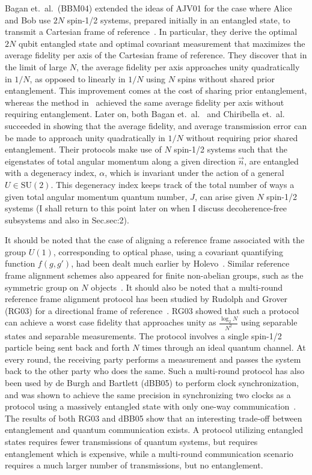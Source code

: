 Bagan et.~al.~(BBM04) extended the ideas of AJV01 for the case where Alice and Bob use $2N$ spin-1/2 systems, prepared initially in an entangled state, to transmit a Cartesian frame of reference~\cite{BBM04a}.  In particular, they derive the optimal $2N$ qubit entangled state and optimal covariant measurement that maximizes the average fidelity per axis of the Cartesian frame of reference. They discover that in the limit of large $N$, the average fidelity per axis approaches unity quadratically in $1/N$, as opposed to linearly in $1/N$ using $N$ spins without shared prior entanglement.  This improvement comes at the cost of sharing prior entanglement, whereas the method in~\cite{PS02a,PS02b} achieved the same average fidelity per axis without requiring entanglement.  Later on, both Bagan et.~al.~\cite{BBM04b} and Chiribella et.~al.~\cite{CDPS04a} succeeded in showing that the average fidelity, and average transmission error can be made to approach unity quadratically in $1/N$ without requiring prior shared entanglement.  Their protocols make use of $N$ spin-1/2 systems such that the eigenstates of total angular momentum along a given direction $\vec{n}$, are entangled with a degeneracy index, $\alpha$, which is invariant under the action of a general $U\in\mathrm{SU}(2)$.  This degeneracy index keeps track of the total number of ways a given total angular momentum quantum number, $J$, can arise given $N$ spin-1/2 systems (I shall return to this point later on when I discuss decoherence-free subsystems and also in Sec.{sec:2}). 

It should be noted that the case of aligning a reference frame associated with the group $U(1)$, corresponding to optical phase, using a covariant quantifying function $f(g,g')$, had been dealt much earlier  by Holevo~\cite{H80}.  Similar reference frame alignment schemes also appeared for finite non-abelian groups, such as the symmetric group on $N$ objects~\cite{KK04}.  It should also be noted that a multi-round reference frame alignment protocol has been studied by Rudolph and Grover (RG03) for a directional frame of reference~\cite{RG03}. RG03 showed that such a protocol can achieve a worst case fidelity that approaches unity as $\frac{\log_2 N}{N^2}$ using separable states and separable measurements.  The protocol involves a single spin-1/2 particle being sent back and forth $N$ times through an ideal quantum channel.  At every round, the receiving party performs a measurement and passes the system back to the other party who does the same. Such a multi-round protocol has also been used by de Burgh and Bartlett (dBB05) to perform clock synchronization, and was shown to achieve the same precision in synchronizing two clocks as a protocol using a massively entangled state with only one-way communication~\cite{dBB05}.  The results of both RG03 and dBB05 show that an interesting trade-off between entanglement and quantum communication exists. A protocol utilizing entangled states requires fewer transmissions of quantum systems, but requires entanglement which is expensive, while a multi-round communication scenario requires a much larger number of transmissions, but no entanglement.  

